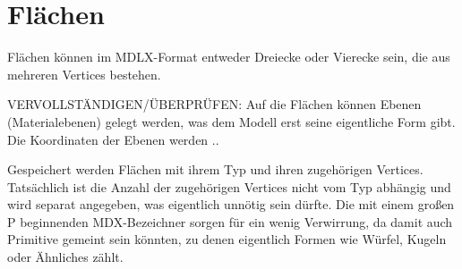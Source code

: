 \section{Flächen}
Flächen können im MDLX-Format entweder Dreiecke oder Vierecke sein, die aus mehreren Vertices bestehen.

VERVOLLSTÄNDIGEN/ÜBERPRÜFEN: Auf die Flächen können Ebenen (Materialebenen) gelegt werden, was dem Modell erst seine eigentliche Form gibt. Die Koordinaten der Ebenen werden ..

Gespeichert werden Flächen mit ihrem Typ und ihren zugehörigen Vertices.
Tatsächlich ist die Anzahl der zugehörigen Vertices nicht vom Typ abhängig und wird separat angegeben, was eigentlich unnötig sein dürfte.
Die mit einem großen P beginnenden MDX-Bezeichner sorgen für ein wenig Verwirrung, da damit auch Primitive gemeint sein könnten, zu denen eigentlich Formen wie Würfel, Kugeln oder Ähnliches zählt.
